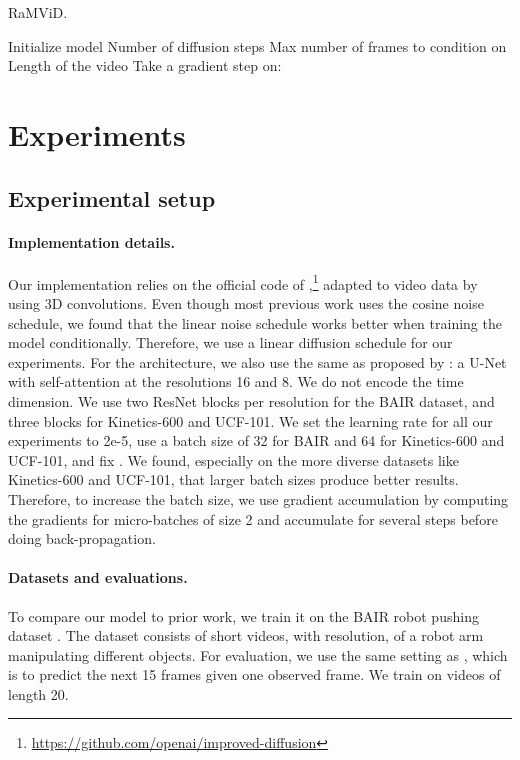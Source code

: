 \documentclass[10pt]{article} \usepackage[accepted]{tmlr}
\begin{document}
\begin{algorithm}
\caption{RaMViD.}\label{alg:ramvid}
\begin{algorithmic}
\State Initialize model 
\State  Number of diffusion steps
\State  Max number of frames to condition on
\State  Length of the video
\State  \State 
\State 
\If{}
\State 
\Else
\State 
\State  
\EndIf
\State 
\State 
\State 
\State Take a gradient step on:  
\EndWhile
\end{algorithmic}
\end{algorithm}



\section{Experiments}
\label{sec:experiments}

\subsection{Experimental setup}
\label{sec:exp_setup}

\paragraph{Implementation details.}
Our implementation relies on the official code of \citet{pmlr-v139-nichol21a},\footnote{\url{https://github.com/openai/improved-diffusion}} adapted to video data by using 3D convolutions. Even though most previous work uses the cosine noise schedule, we found that the linear noise schedule works better when training the model conditionally. Therefore, we use a linear diffusion schedule for our experiments. For the architecture, we also use the same as proposed by \citet{pmlr-v139-nichol21a}: a U-Net with self-attention at the resolutions 16 and 8. We do not encode the time dimension. We use two ResNet blocks per resolution for the BAIR dataset, and three blocks for Kinetics-600 and UCF-101. We set the learning rate for all our experiments to 2e-5, use a batch size of 32 for BAIR and 64 for Kinetics-600 and UCF-101, and fix . We found, especially on the more diverse datasets like Kinetics-600 and UCF-101, that larger batch sizes produce better results. Therefore, to increase the batch size, we use gradient accumulation by computing the gradients for micro-batches of size 2 and accumulate for several steps before doing back-propagation.

\paragraph{Datasets and evaluations.} 
To compare our model to prior work, we train it on the BAIR robot pushing dataset \citep{ebert_2017}. The dataset consists of short videos, with  resolution, of a robot arm manipulating different objects. For evaluation, we use the same setting as \citet{Rakhimov_2020}, which is to predict the next 15 frames given one observed frame. We train on videos of length 20.
\end{document}
